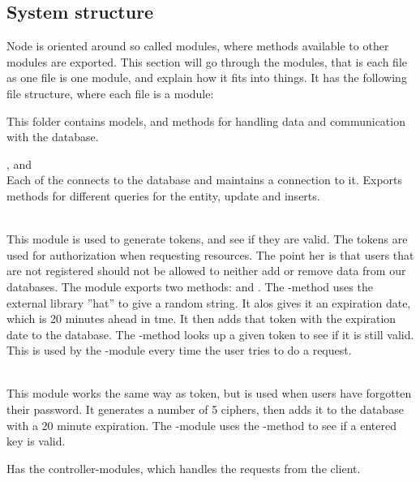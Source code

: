 \subsection{System structure}
Node is oriented around so called modules, where methods available to other modules are exported. This section will go through the modules, that is each file as one file is one module, and explain how it fits into things. It has the following file structure, where each file is a module:
\begin{description}
    \item{\textbf{}} This folder contains models, and methods for handling data and communication with the database.
        \begin{description}
            \item{,  and } \\ 
                Each of the connects to the database and maintains a connection to it. Exports methods for different queries for the entity, update and inserts. 
            \item{} \\ 
                This module is used to generate tokens, and see if they are valid. The tokens are used for authorization when requesting resources. The point her is that users that are not registered should not be allowed to neither add or remove data from our databases. The module exports two methods:  and . The -method uses the external library ''hat'' to give a random string. \cite{hat} It alos gives it an expiration date, which is 20 minutes ahead in tme. It then adds that token with the expiration date to the database. The  -method looks up a given token to see if it is still valid. This is used by the -module every time the user tries to do a request.
            \item{} \\
                This module works the same way as token, but is used when users have forgotten their password. It generates a number of 5 ciphers, then adds it to the database with a 20 minute expiration. The   -module uses the -method to see if a entered key is valid.
        \end{description}
    \item{\textbf{}} Has the controller-modules, which handles the requests from the client. 

\end{description}
